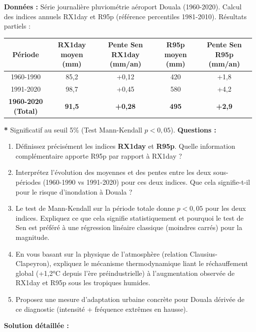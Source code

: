 \documentclass[11pt]{article}
\begin{document}
\begin{exoresolu}
\textbf{Données :} Série journalière pluviométrie aéroport Douala (1960-2020). Calcul des indices annuels RX1day et R95p (référence percentiles 1981-2010). Résultats partiels :
\begin{center}
    \begin{tabular}{|c|c|c|c|c|}\hline
        \rowcolor{popblueL} \textbf{Période} & \textbf{RX1day moyen (mm)} & \textbf{Pente Sen RX1day (mm/an)} & \textbf{R95p moyen (mm)} & \textbf{Pente Sen R95p (mm/an)} \\ \hline
        1960-1990 & 85,2 & +0,12 & 420 & +1,8 \\ \hline
        1991-2020 & 98,7 & +0,45 & 580 & +4,2 \\ \hline
        \textbf{1960-2020 (Total)} & \textbf{91,5} & \textbf{+0,28} & \textbf{495} & \textbf{+2,9} \\ \hline
    \end{tabular}
\end{center}
\textbf{*} Significatif au seuil 5\% (Test Mann-Kendall $p < 0,05$).
\textbf{Questions :}
\begin{enumerate}
    \item Définissez précisément les indices \textbf{RX1day} et \textbf{R95p}. Quelle information complémentaire apporte R95p par rapport à RX1day ?
    \item Interprétez l'évolution des moyennes et des pentes entre les deux sous-périodes (1960-1990 vs 1991-2020) pour ces deux indices. Que cela signifie-t-il pour le risque d'inondation à Douala ?
    \item Le test de Mann-Kendall sur la période totale donne $p < 0,05$ pour les deux indices. Expliquez ce que cela signifie statistiquement et pourquoi le test de Sen est préféré à une régression linéaire classique (moindres carrés) pour la magnitude.
    \item En vous basant sur la physique de l'atmosphère (relation Clausius-Clapeyron), expliquez le mécanisme thermodynamique liant le réchauffement global (+1,2°C depuis l'ère préindustrielle) à l'augmentation observée de RX1day et R95p sous les tropiques humides.
    \item Proposez une mesure d'adaptation urbaine concrète pour Douala dérivée de ce diagnostic (intensité + fréquence extrêmes en hausse).
\end{enumerate}
\tcblower
\textbf{Solution détaillée :}
\begin{enumerate}

\end{enumerate}
\end{exoresolu}
\end{document}
